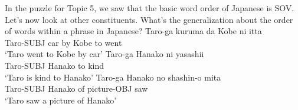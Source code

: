 \documentclass{article}
\begin{document}
In the puzzle for Topic 5, we saw that the basic word order of Japanese is SOV. Let's now look at other constituents. What's the generalization about the order of words within a phrase in Japanese?
\ea
    \ea \gll Taro-ga kuruma	da Kobe ni itta\\
            Taro-SUBJ car by Kobe to went\\
        \glt `Taro went to Kobe by car'
    \ex \gll Taro-ga Hanako ni yasashii\\
            Taro-SUBJ Hanako to kind\\
        \glt `Taro is kind to Hanako'
    \ex \gll Taro-ga Hanako no shashin-o mita\\
            Taro-SUBJ Hanako of picture-OBJ saw\\
        \glt `Taro saw a picture of Hanako'
    \z
\z
\end{document}
